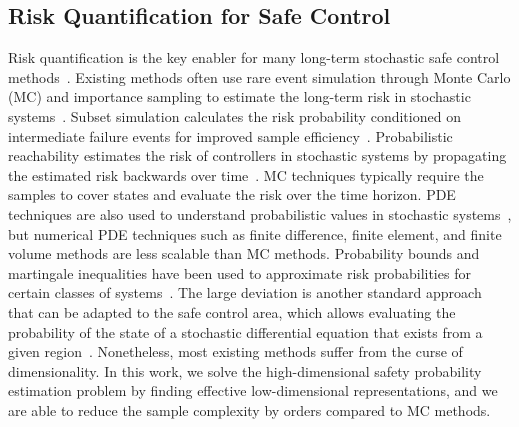 \documentclass[letterpaper]{article} %
\newcommand{\resolved}[1]{}
\begin{document}


\subsection{Risk Quantification for Safe Control}
\resolved{similar topic but alternative objectives, or just cite related safe control papers}
\resolved{add more recent papers on risk quantification}

Risk quantification is the key enabler for many long-term stochastic safe control methods~\cite{wang2021myopically,jing2022probabilistic}.
Existing methods often use rare event simulation through Monte Carlo (MC) and importance sampling to estimate the long-term risk in stochastic systems~\cite{ botev2013markov,hanna2021importance,stadie2018some,madhushani2020hamiltonian}. Subset simulation calculates the risk probability conditioned on intermediate failure events for improved sample efficiency~\cite{huang2016assessing, zhao2022subset, rashki2021sesc}. Probabilistic reachability estimates the risk of controllers in stochastic systems by propagating the estimated risk backwards over time~\cite{hewing2018stochastic,bansal2020hamilton,huh2020safe}. MC techniques typically require the samples to cover states and evaluate the risk over the time horizon.
PDE techniques are also used to understand probabilistic values in stochastic systems~\cite{chern2021safe,feng2014comparative}, but numerical PDE techniques such as finite difference, finite element, and finite volume methods are less scalable than MC methods. 
Probability bounds and martingale inequalities have been used to approximate risk probabilities for certain classes of systems~\cite{clark2019control,yaghoubi2020risk,santoyo2021barrier,cheng2020safe, meng2022sufficient, nishimura2023control}. 
The large deviation is another standard approach that can be adapted to the safe control area, which allows evaluating the probability of the state of a stochastic differential equation that exists from a given region~\cite{bressloff2014path,bertini2015large}. 
Nonetheless, most existing methods suffer from the curse of dimensionality. In this work, we solve the high-dimensional safety probability estimation problem by finding effective low-dimensional representations, and we are able to reduce the sample complexity by orders compared to MC methods.
\end{document}
